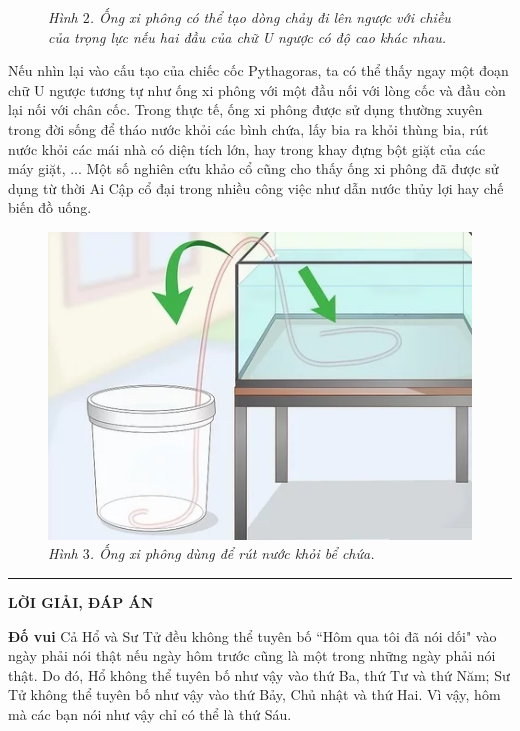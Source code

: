\begin{multicols}{2}
\begin{figure}[H]
		\caption{\small\textit{\color{quantoan}Hình $2$. Ống xi phông có thể tạo dòng chảy đi lên ngược với chiều của trọng lực nếu hai đầu của chữ U ngược có độ cao khác nhau.}}
		\vspace*{-10pt}
	\end{figure}
	Nếu nhìn lại vào cấu tạo của chiếc cốc Pythagoras, ta có thể thấy ngay một đoạn chữ U ngược tương tự như ống xi phông với một đầu nối với lòng cốc và đầu còn lại nối với chân cốc. Trong thực tế, ống xi phông được sử dụng thường xuyên trong đời sống để tháo nước khỏi các bình chứa, lấy bia ra khỏi thùng bia, rút nước khỏi các mái nhà có diện tích lớn, hay trong khay đựng bột giặt của các máy giặt, ...  Một số nghiên cứu khảo cổ cũng cho thấy ống xi phông đã được sử dụng từ thời Ai Cập cổ đại trong nhiều công việc như dẫn nước thủy lợi hay chế biến đồ uống. 
	\begin{figure}[H]
		\vspace*{-5pt}
		\centering
		\captionsetup{labelformat= empty, justification=centering}
		\includegraphics[width= 1\linewidth]{3}
		\caption{\small\textit{\color{quantoan}Hình $3$. Ống xi phông dùng để rút nước khỏi bể chứa.}}
		\vspace*{-10pt}
	\end{figure}
\end{multicols}
\vspace*{-10pt}
{\color{quantoan}\rule{1\linewidth}{0.1pt}}
\vskip 0.2cm
\centerline{\LARGE{\textbf{\color{quantoan}LỜI GIẢI, ĐÁP ÁN}}}
\begin{multicols}{2}
	\textbf{\color{quantoan}Đố vui}
	\vskip 0.1cm
	Cả Hổ và Sư Tử đều không thể tuyên bố ``Hôm qua tôi đã nói dối" vào ngày phải nói thật nếu ngày hôm trước cũng là một trong những ngày phải nói thật. Do đó, Hổ  không thể tuyên bố như vậy vào thứ Ba, thứ Tư  và thứ Năm; Sư Tử không thể tuyên bố như vậy vào thứ Bảy, Chủ nhật  và thứ Hai. 
	Vì vậy, hôm mà các bạn nói như vậy chỉ có thể là thứ Sáu.
\end{multicols}